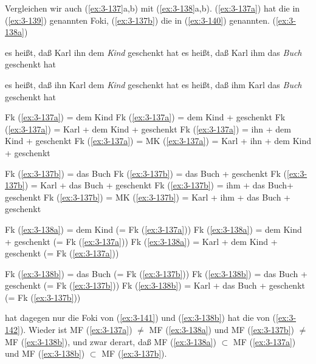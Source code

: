 \documentclass[output=paper]{langsci/langscibook}
\begin{document}
Vergleichen wir auch (\ref{ex:3-137}a,b) mit (\ref{ex:3-138}a,b). (\ref{ex:3-137a}) hat die in (\ref{ex:3-139}) genannten Foki, (\ref{ex:3-137b}) die in (\ref{ex:3-140})
genannten. (\ref{ex:3-138a})
\begin{exe}
\ex
\label{ex:3-137}
\begin{xlist}
\ex
\label{ex:3-137a}
es heißt, daß Karl ihn dem \textit{Kind} geschenkt hat
\ex
\label{ex:3-137b}
es heißt, daß Karl ihm das \textit{Buch} geschenkt hat
\end{xlist}
\ex
\label{ex:3-138}
\begin{xlist}
\ex
\label{ex:3-138a}
es heißt, daß ihn Karl dem \textit{Kind} geschenkt hat
\ex
\label{ex:3-138b}
es heißt, daß ihm Karl das \textit{Buch} geschenkt hat
\end{xlist}
\ex
\label{ex:3-139}
\begin{xlist}
\ex
\label{ex:3-139a}
Fk (\ref{ex:3-137a}) = dem Kind
\ex
\label{ex:3-139b}
Fk (\ref{ex:3-137a}) = dem Kind + geschenkt
\ex
\label{ex:3-139c}
Fk (\ref{ex:3-137a}) = Karl + dem Kind + geschenkt
\ex
\label{ex:3-139d}
Fk (\ref{ex:3-137a}) = ihn + dem Kind + geschenkt
\ex
\label{ex:3-139e}
Fk (\ref{ex:3-137a}) = MK (\ref{ex:3-137a}) = Karl + ihn + dem Kind + geschenkt
\end{xlist}
\ex
\label{ex:3-140}
\begin{xlist}
\ex
\label{ex:3-140a}
Fk (\ref{ex:3-137b}) = das Buch
\ex
\label{ex:3-140b}
Fk (\ref{ex:3-137b}) = das Buch + geschenkt
\ex
\label{ex:3-140c}
Fk (\ref{ex:3-137b}) = Karl + das Buch + geschenkt
\ex
\label{ex:3-140d}
Fk (\ref{ex:3-137b}) = ihm + das Buch+ geschenkt
\ex
\label{ex:3-140e}
Fk (\ref{ex:3-137b}) = MK (\ref{ex:3-137b}) = Karl + ihm + das Buch + geschenkt
\end{xlist}
\ex
\label{ex:3-141}
\begin{xlist}
\ex
\label{ex:3-141a}
Fk (\ref{ex:3-138a}) = dem Kind (= Fk (\ref{ex:3-137a}))
\ex
\label{ex:3-141b}
Fk (\ref{ex:3-138a}) = dem Kind + geschenkt (= Fk (\ref{ex:3-137a}))
\ex
\label{ex:3-141c}
Fk (\ref{ex:3-138a}) = Karl + dem Kind + geschenkt (= Fk (\ref{ex:3-137a}))
\end{xlist}
\ex
\label{ex:3-142}
\begin{xlist}
\ex
\label{ex:3-142a}
Fk (\ref{ex:3-138b}) = das Buch (= Fk (\ref{ex:3-137b}))
\ex
\label{ex:3-142b}
Fk (\ref{ex:3-138b}) = das Buch + geschenkt (= Fk (\ref{ex:3-137b}))
\ex
\label{ex:3-142c}
Fk (\ref{ex:3-138b}) = Karl + das Buch + geschenkt (= Fk (\ref{ex:3-137b}))
\end{xlist}
\end{exe}
hat dagegen nur die Foki von (\ref{ex:3-141}) und (\ref{ex:3-138b}) hat die von
(\ref{ex:3-142}). Wieder ist MF (\ref{ex:3-137a}) $\neq$ MF (\ref{ex:3-138a}) und MF (\ref{ex:3-137b}) $\neq$ MF
(\ref{ex:3-138b}), und zwar derart, daß MF (\ref{ex:3-138a}) $\subset$ MF (\ref{ex:3-137a}) und MF (\ref{ex:3-138b}) $\subset$ MF
(\ref{ex:3-137b}).
\end{document}
